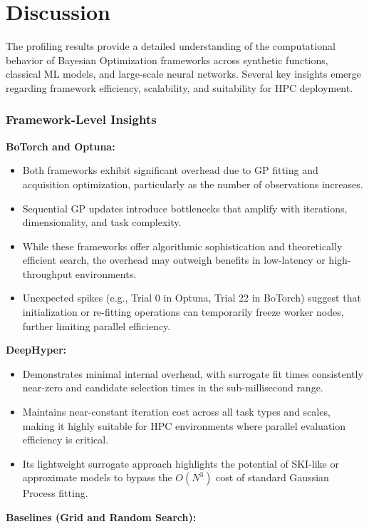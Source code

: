 \documentclass[11pt]{article}
\begin{document}
\section{Discussion}
The profiling results provide a detailed understanding of the computational behavior of Bayesian Optimization frameworks across synthetic functions, classical ML models, and large-scale neural networks. Several key insights emerge regarding framework efficiency, scalability, and suitability for HPC deployment.

\subsubsection{ Framework-Level Insights}

\textbf{BoTorch and Optuna:}

\begin{itemize}
    \item Both frameworks exhibit significant overhead due to GP fitting and acquisition optimization, particularly as the number of observations increases.
    \item Sequential GP updates introduce bottlenecks that amplify with iterations, dimensionality, and task complexity.
    \item While these frameworks offer algorithmic sophistication and theoretically efficient search, the overhead may outweigh benefits in low-latency or high-throughput environments.
    \item Unexpected spikes (e.g., Trial 0 in Optuna, Trial 22 in BoTorch) suggest that initialization or re-fitting operations can temporarily freeze worker nodes, further limiting parallel efficiency.
\end{itemize}
\textbf{DeepHyper:}

\begin{itemize}
    \item Demonstrates minimal internal overhead, with surrogate fit times consistently near-zero and candidate selection times in the sub-millisecond range.
    \item Maintains near-constant iteration cost across all task types and scales, making it highly suitable for HPC environments where parallel evaluation efficiency is critical.
    \item Its lightweight surrogate approach highlights the potential of SKI-like or approximate models to bypass the $O(N^3)$ cost of standard Gaussian Process fitting.
\end{itemize}
\textbf{Baselines (Grid and Random Search):}
\end{document}
